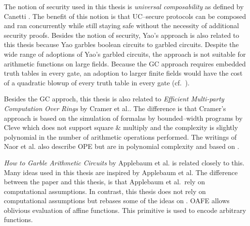 The notion of security used in this thesis is \emph{universal composability} as
defined by Canetti \cite{canetti05}. The benefit of this notion is that
UC--secure protocols can be composed and ran concurrently while still staying
safe without the necessity of additional security proofs. Besides the notion of
security, Yao's  approach \cite{yao86} is also
related to this thesis because Yao garbles boolean circuits to garbled circuits.
Despite the wide range of adoptions of Yao's garbled circuits, the approach is
not suitable for arithmetic functions on large fields. Because the GC approach
requires embedded truth tables in every gate, an adoption to larger finite
fields would have the cost of a quadratic blowup of every truth table in every
gate (cf.\ \cite{naor99privacy}).

Besides the GC approch, this thesis is also related to \emph{Efficient
Multi-party Computation Over Rings} by Cramer et al.\cite{cramer03}. The
difference is that Cramer's approach is based on the simulation of formalas by
bounded--width programs by Cleve \cite{cleve91} which does not support square \&
multiply \cite{knuth81} and the complexity is slightly polynomial in the number
of arithmetic operations performed. The writings of Naor et
al.\cite{naor99,naor06} also describe OPE but are in polynomial complexity and
based on  \cite{rabin81}.

\emph{How to Garble Arithmetic Circuits} by Applebaum et al.\cite{gac2012} is
related closely to this. Many ideas used in this thesis are inspired by
Applebaum et al. The difference between the paper and this thesis, is that
Applebaum et al.\ rely on computational assumptions. In contrast, this thesis
does not rely on computational assumptions but rebases some of the ideas on
 \cite{davidgoliath}. OAFE
allows oblivious evaluation of affine functions. This primitive is used to
encode arbitrary functions.

